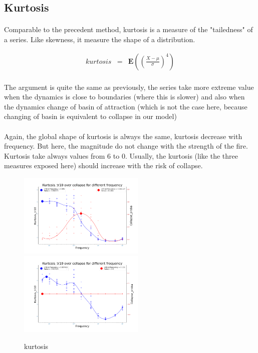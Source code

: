 \documentclass{article}
\begin{document}
\subsection{Kurtosis}

\paragraph{}
Comparable to the precedent method, kurtosis is a measure of the "tailedness" of a series. Like skewness, it measure the shape of a distribution.

\[
\begin{array}{rcl}
kurtosis & = & \mathbf{E}((\frac{X-\mu}{\sigma})^4) \\
\end{array}
\]

The argument is quite the same as previously, the series take more extreme value when the dynamics is close to boundaries (where this is slower) and also when the dynamics change of basin of attraction (which is not the case here, because changing of basin is equivalent to collapse in our model) \citep{biggs2009turning}


\paragraph{} %
Again, the global shape of kurtosis is always the same, kurtosis decrease with frequency. But here, the magnitude do not change with the strength of the fire. Kurtosis take always values from $6$ to $0$. Usually, the kurtosis (like the three measures exposed here) should increase with the risk of collapse.


\begin{figure}[h!]
\centering
\includegraphics[width=6cm]{kurtosis2b.png}
\includegraphics[width=6cm]{kurtosis1b.png}
\caption{kurtosis}
\end{figure}
\end{document}
